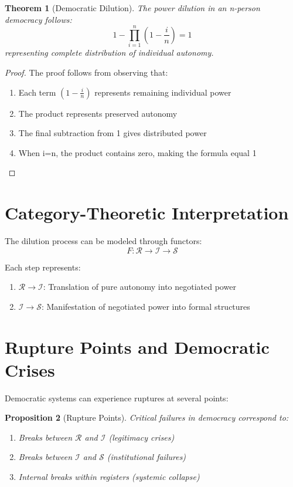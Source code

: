 \documentclass[12pt]{article}
\theoremstyle{plain}
\newtheorem{theorem}{Theorem}
\newtheorem{proposition}[theorem]{Proposition}
\begin{document}
\begin{theorem}[Democratic Dilution]
The power dilution in an n-person democracy follows:
\[ 1 - \prod_{i=1}^n(1-\frac{i}{n}) = 1 \]
representing complete distribution of individual autonomy.
\end{theorem}

\begin{proof}
The proof follows from observing that:
\begin{enumerate}
    \item Each term $(1-\frac{i}{n})$ represents remaining individual power
    \item The product represents preserved autonomy
    \item The final subtraction from 1 gives distributed power
    \item When i=n, the product contains zero, making the formula equal 1
\end{enumerate}
\end{proof}

\section{Category-Theoretic Interpretation}

The dilution process can be modeled through functors:
\[ F: \mathcal{R} \to \mathcal{I} \to \mathcal{S} \]

Each step represents:
\begin{enumerate}
    \item $\mathcal{R} \to \mathcal{I}$: Translation of pure autonomy into negotiated power
    \item $\mathcal{I} \to \mathcal{S}$: Manifestation of negotiated power into formal structures
\end{enumerate}

\section{Rupture Points and Democratic Crises}

Democratic systems can experience ruptures at several points:

\begin{proposition}[Rupture Points]
Critical failures in democracy correspond to:
\begin{enumerate}
    \item Breaks between $\mathcal{R}$ and $\mathcal{I}$ (legitimacy crises)
    \item Breaks between $\mathcal{I}$ and $\mathcal{S}$ (institutional failures)
    \item Internal breaks within registers (systemic collapse)
\end{enumerate}
\end{proposition}
\end{document}
